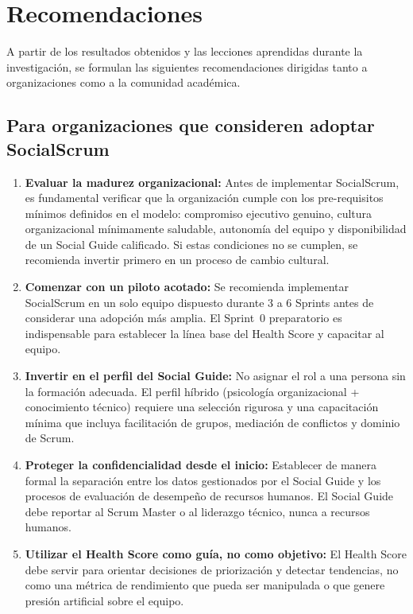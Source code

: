 \section{Recomendaciones}
\label{sec:recomendaciones}

A partir de los resultados obtenidos y las lecciones aprendidas durante la investigación, se formulan las siguientes recomendaciones dirigidas tanto a organizaciones como a la comunidad académica.

\subsection{Para organizaciones que consideren adoptar SocialScrum}

\begin{enumerate}
    \item \textbf{Evaluar la madurez organizacional:} Antes de implementar SocialScrum, es fundamental verificar que la organización cumple con los pre-requisitos mínimos definidos en el modelo: compromiso ejecutivo genuino, cultura organizacional mínimamente saludable, autonomía del equipo y disponibilidad de un Social Guide calificado. Si estas condiciones no se cumplen, se recomienda invertir primero en un proceso de cambio cultural.

    \item \textbf{Comenzar con un piloto acotado:} Se recomienda implementar SocialScrum en un solo equipo dispuesto durante 3 a 6 Sprints antes de considerar una adopción más amplia. El Sprint~0 preparatorio es indispensable para establecer la línea base del Health Score y capacitar al equipo.

    \item \textbf{Invertir en el perfil del Social Guide:} No asignar el rol a una persona sin la formación adecuada. El perfil híbrido (psicología organizacional + conocimiento técnico) requiere una selección rigurosa y una capacitación mínima que incluya facilitación de grupos, mediación de conflictos y dominio de Scrum.

    \item \textbf{Proteger la confidencialidad desde el inicio:} Establecer de manera formal la separación entre los datos gestionados por el Social Guide y los procesos de evaluación de desempeño de recursos humanos. El Social Guide debe reportar al Scrum Master o al liderazgo técnico, nunca a recursos humanos.

    \item \textbf{Utilizar el Health Score como guía, no como objetivo:} El Health Score debe servir para orientar decisiones de priorización y detectar tendencias, no como una métrica de rendimiento que pueda ser manipulada o que genere presión artificial sobre el equipo.
\end{enumerate}


